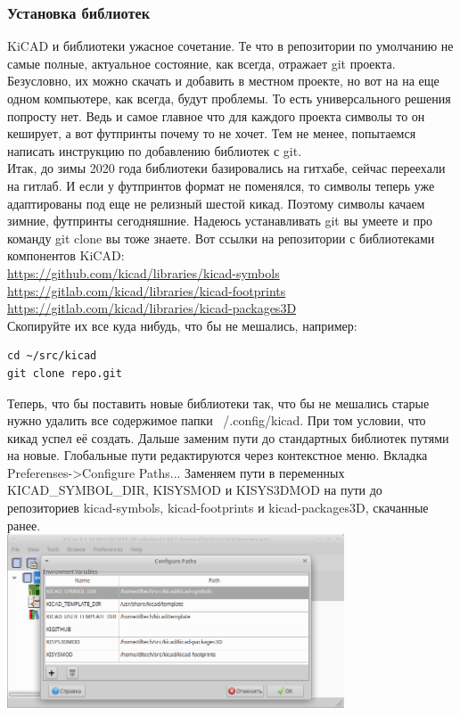\documentclass[12pt,a4paper]{article}
\begin{document}
\subsubsection{Установка библиотек}
    KiCAD и библиотеки ужасное сочетание. Те что в репозитории по умолчанию не
    самые полные, актуальное состояние, как всегда, отражает git проекта.
    Безусловно, их можно скачать и добавить в местном проекте, но вот на
    на еще одном компьютере, как всегда, будут проблемы. То есть универсального
    решения попросту нет. Ведь и самое главное что для каждого проекта
     символы то он кеширует, а вот футпринты почему то не хочет.
    Тем не менее, попытаемся написать инструкцию по добавлению библиотек с git.\\
    Итак, до зимы 2020 года библиотеки базировались на гитхабе, сейчас переехали
    на гитлаб. И если у футпринтов формат не поменялся, то символы теперь уже
    адаптированы под еще не релизный шестой кикад. Поэтому символы качаем
    зимние, футпринты сегодняшние. Надеюсь устанавливать git вы умеете и про
    команду git clone вы тоже знаете.
    Вот ссылки на репозитории с библиотеками компонентов KiCAD:\\
    \url{https://github.com/kicad/libraries/kicad-symbols}\\
    \url{https://gitlab.com/kicad/libraries/kicad-footprints}\\
    \url{https://gitlab.com/kicad/libraries/kicad-packages3D}\\
    Скопируйте их все куда нибудь, что бы не мешались, например:
\begin{lstlisting}
cd ~/src/kicad
git clone repo.git
\end{lstlisting}
    Теперь, что бы поставить новые библиотеки так, что бы не мешались старые
    нужно удалить все содержимое папки ~/.config/kicad. При том условии, что
    кикад успел её создать. Дальше заменим пути
    до стандартных библиотек путями на новые. Глобальные пути редактируются
    через контекстное меню. Вкладка Preferenses->Configure Paths...
    Заменяем пути в переменных KICAD\_SYMBOL\_DIR, KISYSMOD и KISYS3DMOD на пути
    до репозиториев kicad-symbols, kicad-footprints и kicad-packages3D, скачанные
    ранее.\\
    \includegraphics[width=10cm]{kipath.png}\\
\end{document}
